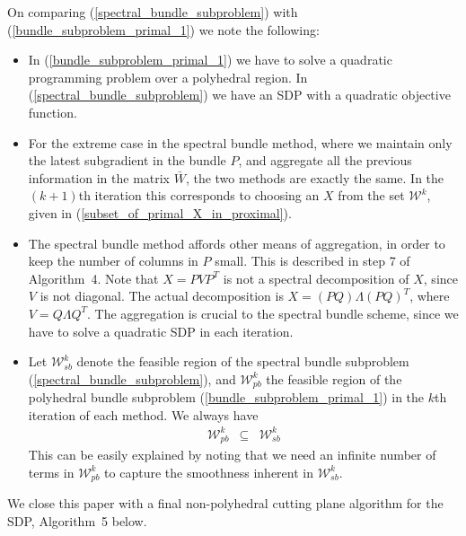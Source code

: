 \documentclass[12pt]{kluwer}
\begin{document}
\begin{article}
On comparing (\ref{spectral_bundle_subproblem}) with (\ref{bundle_subproblem_primal_1}) we note the following:
\begin{itemize}
\item In (\ref{bundle_subproblem_primal_1}) we have to solve a quadratic programming problem over a polyhedral region.
In (\ref{spectral_bundle_subproblem}) we have an SDP with a quadratic objective function.
\item For the extreme case in the spectral bundle method, where we maintain only the latest subgradient in the
bundle $P$, and aggregate all the previous information in the matrix $\bar{W}$, the two methods are
exactly the same. In the $(k+1)$th iteration this corresponds to choosing an $X$ from the set $\mathcal{W}^k$,
given in (\ref{subset_of_primal_X_in_proximal}).
\item The spectral bundle method affords other means of aggregation, in order to keep the number of columns in $P$
small. This is described in step 7 of Algorithm~4. Note that $X = PVP^T$ is not a spectral decomposition of $X$,
since $V$ is not diagonal. The actual decomposition is $ X = (PQ)\Lambda(PQ)^T$, where $V = Q \Lambda Q^T$.
The aggregation is crucial to the spectral
bundle scheme, since we have to solve a quadratic SDP in each iteration.
\item Let $\mathcal{W}_{sb}^k$ denote the feasible region of the spectral
bundle subproblem (\ref{spectral_bundle_subproblem}), and 
$\mathcal{W}_{pb}^k$ the feasible region of the polyhedral bundle
subproblem (\ref{bundle_subproblem_primal_1}) in the $k$th iteration of each method. We always have
\begin{displaymath}
\begin{array}{ccc}
\mathcal{W}_{pb}^k & \subseteq & \mathcal{W}_{sb}^k
\end{array}
\end{displaymath}
This can be easily explained by noting that we need an infinite number
of terms in $\mathcal{W}_{pb}^k$ to capture the smoothness inherent in $\mathcal{W}_{sb}^k$.
\end{itemize}

We close this paper with a final non-polyhedral cutting plane algorithm
for the SDP, Algorithm~5 below.


\end{article}
\end{document}
